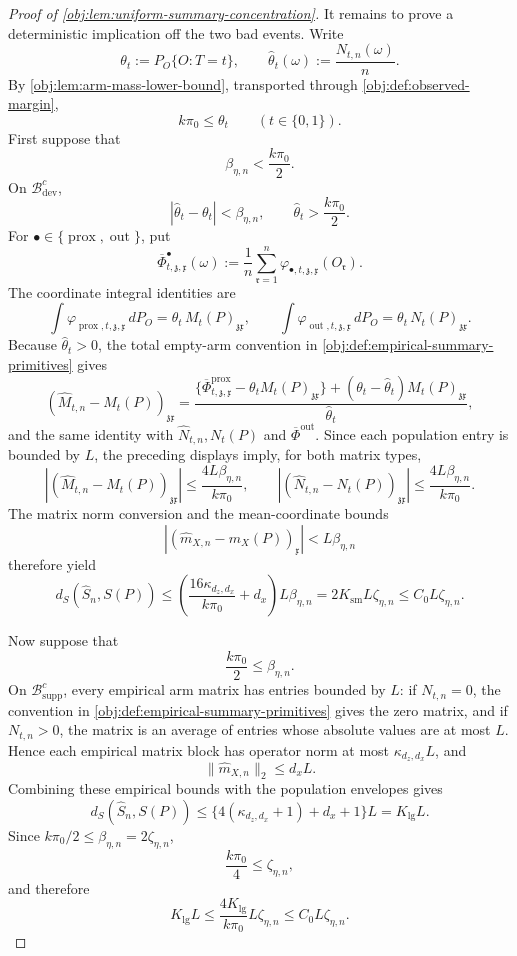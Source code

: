 \begin{proof}[Proof of \cref{obj:lem:uniform-summary-concentration}]
It remains to prove a deterministic implication off the two bad events.  Write
\[
\theta_t:=P_O\{O:T=t\},
\qquad
\widehat\theta_t(\omega):=\frac{N_{t,n}(\omega)}{n}.
\]
By \cref{obj:lem:arm-mass-lower-bound}, transported through
\cref{obj:def:observed-margin},
\[
k\pi_0\le \theta_t
\qquad(t\in\{0,1\}).
\]
First suppose that
\[
\beta_{\eta,n}<\frac{k\pi_0}{2}.
\]
On \(\mathcal B_{\mathrm{dev}}^c\),
\[
|\widehat\theta_t-\theta_t|<\beta_{\eta,n},
\qquad
\widehat\theta_t>\frac{k\pi_0}{2}.
\]
For \(\bullet\in\{\operatorname{prox},\operatorname{out}\}\), put
\[
\overline\Phi^\bullet_{t,\mathfrak z,\mathfrak x}(\omega)
:=
\frac1n\sum_{\mathfrak r=1}^n
\varphi_{\bullet,t,\mathfrak z,\mathfrak x}(O_{\mathfrak r}).
\]
The coordinate integral identities are
\[
\int\varphi_{\operatorname{prox},t,\mathfrak z,\mathfrak x}\,dP_O
=
\theta_t\,M_t(P)_{\mathfrak z\mathfrak x},
\qquad
\int\varphi_{\operatorname{out},t,\mathfrak z,\mathfrak x}\,dP_O
=
\theta_t\,N_t(P)_{\mathfrak z\mathfrak x}.
\]
Because \(\widehat\theta_t>0\), the total empty-arm convention in
\cref{obj:def:empirical-summary-primitives} gives
\[
(\widehat M_{t,n}-M_t(P))_{\mathfrak z\mathfrak x}
=
\frac{
\{\overline\Phi^{\operatorname{prox}}_{t,\mathfrak z,\mathfrak x}
-\theta_tM_t(P)_{\mathfrak z\mathfrak x}\}
+
(\theta_t-\widehat\theta_t)M_t(P)_{\mathfrak z\mathfrak x}
}{\widehat\theta_t},
\]
and the same identity with \(\widehat N_{t,n},N_t(P)\) and
\(\overline\Phi^{\operatorname{out}}\).  Since each population entry is bounded
by \(L\), the preceding displays imply, for both matrix types,
\[
\left|
(\widehat M_{t,n}-M_t(P))_{\mathfrak z\mathfrak x}
\right|
\le
\frac{4L\beta_{\eta,n}}{k\pi_0},
\qquad
\left|
(\widehat N_{t,n}-N_t(P))_{\mathfrak z\mathfrak x}
\right|
\le
\frac{4L\beta_{\eta,n}}{k\pi_0}.
\]
The matrix norm conversion and the mean-coordinate bounds
\[
|(\widehat m_{X,n}-m_X(P))_{\mathfrak x}|<L\beta_{\eta,n}
\]
therefore yield
\[
d_S(\widehat S_n,S(P))
\le
\left(\frac{16\kappa_{d_z,d_x}}{k\pi_0}+d_x\right)L\beta_{\eta,n}
=
2K_{\mathrm{sm}}L\zeta_{\eta,n}
\le
C_0L\zeta_{\eta,n}.
\]  %

Now suppose that
\[
\frac{k\pi_0}{2}\le \beta_{\eta,n}.
\]
On \(\mathcal B_{\mathrm{supp}}^c\), every empirical arm matrix has entries
bounded by \(L\): if \(N_{t,n}=0\), the convention in
\cref{obj:def:empirical-summary-primitives} gives the zero matrix, and if
\(N_{t,n}>0\), the matrix is an average of entries whose absolute values are at
most \(L\).  Hence each empirical matrix block has operator norm at most
\(\kappa_{d_z,d_x}L\), and
\[
\|\widehat m_{X,n}\|_2\le d_xL .
\]
Combining these empirical bounds with the population envelopes gives
\[
d_S(\widehat S_n,S(P))
\le
\{4(\kappa_{d_z,d_x}+1)+d_x+1\}L
=
K_{\mathrm{lg}}L .
\]
Since \(k\pi_0/2\le\beta_{\eta,n}=2\zeta_{\eta,n}\),
\[
\frac{k\pi_0}{4}\le \zeta_{\eta,n},
\]
and therefore
\[
K_{\mathrm{lg}}L
\le
\frac{4K_{\mathrm{lg}}}{k\pi_0}L\zeta_{\eta,n}
\le
C_0L\zeta_{\eta,n}.
\]  %


\end{proof}
